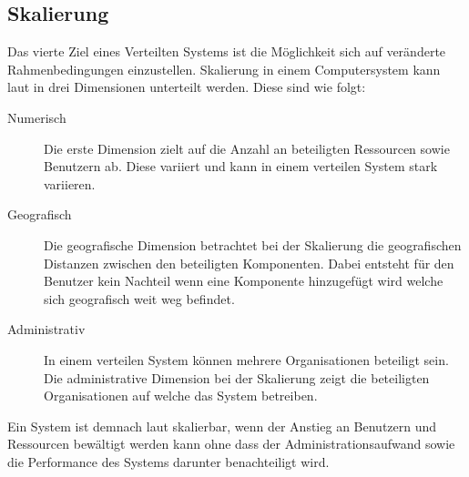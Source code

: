 \subsection{Skalierung}\label{sec:distributedSystems:goales:scalability} 
Das vierte Ziel eines Verteilten Systems ist die Möglichkeit sich auf veränderte Rahmenbedingungen einzustellen. Skalierung in einem Computersystem kann laut \cite{Neuman1993Scale} in drei Dimensionen unterteilt werden. Diese sind wie folgt: 
\begin{description}
    \item[Numerisch] Die erste Dimension zielt auf die Anzahl an beteiligten Ressourcen sowie Benutzern ab. Diese variiert  und kann in einem verteilen System stark variieren.
% 
% 
% 
    \item[Geografisch] Die geografische Dimension betrachtet bei der Skalierung die geografischen Distanzen zwischen den beteiligten Komponenten. Dabei entsteht für den Benutzer kein Nachteil wenn eine Komponente hinzugefügt wird welche sich geografisch weit weg befindet.
    \item[Administrativ] In einem verteilen System können mehrere Organisationen beteiligt sein. Die administrative Dimension bei der Skalierung zeigt die beteiligten Organisationen auf welche das System betreiben.
\end{description}
Ein System ist demnach laut \cite{Neuman1993Scale} skalierbar, wenn der Anstieg an Benutzern und Ressourcen bewältigt werden kann ohne dass der Administrationsaufwand sowie die Performance des Systems darunter benachteiligt wird. \\

